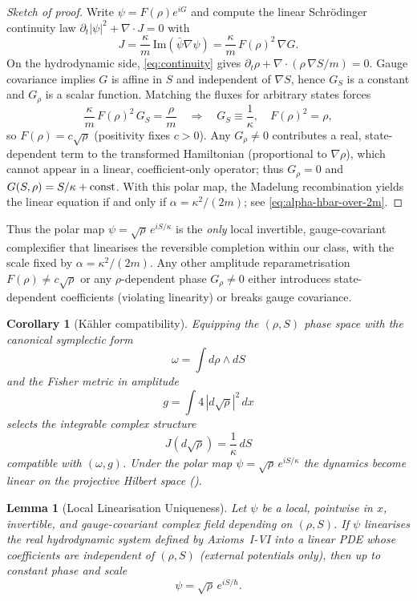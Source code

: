 \documentclass[11pt,a4paper]{article}
\numberwithin{equation}{section}
\theoremstyle{thmcompact}
\newtheorem{lemma}[theorem]{Lemma}
\newtheorem{corollary}[theorem]{Corollary}
\theoremstyle{remark}
\begin{document}
\begin{proof}[Sketch of proof]
	Write $\psi=F(\rho)e^{iG}$ and compute the linear Schrödinger continuity law
	\(
	\partial_t|\psi|^2+\nabla\!\cdot J=0
	\)
	with
	\[
	J=\frac{\kappa}{m}\,\mathrm{Im}(\bar\psi\nabla\psi)
	= \frac{\kappa}{m}\,F(\rho)^2\,\nabla G.
	\]
	On the hydrodynamic side, \eqref{eq:continuity} gives
	\(
	\partial_t\rho+\nabla\!\cdot(\rho\,\nabla S/m)=0.
	\)
	Gauge covariance implies $G$ is affine in $S$ and independent of $\nabla S$,
	hence $G_S$ is a constant and $G_\rho$ is a scalar function. Matching the
	fluxes for arbitrary states forces
	\[
	\frac{\kappa}{m}\,F(\rho)^2\,G_S=\frac{\rho}{m}
	\quad\Rightarrow\quad
	G_S\equiv\frac{1}{\kappa},\quad F(\rho)^2=\rho,
	\]
	so $F(\rho)=c\sqrt\rho$ (positivity fixes $c>0$). Any $G_\rho\neq 0$
	contributes a real, state-dependent term to the transformed Hamiltonian
	(proportional to $\nabla\rho$), which cannot appear in a linear,
	coefficient-only operator; thus $G_\rho=0$ and
	$G(S,\rho)=S/\kappa+{\rm const}$. With this polar map, the Madelung
	recombination yields the linear equation if and only if
	$\alpha=\kappa^{2}/(2m)$; see \eqref{eq:alpha-hbar-over-2m}.
\end{proof}

Thus the polar map $\psi=\sqrt{\rho}\,e^{iS/\kappa}$ is the \emph{only} local
invertible, gauge-covariant complexifier that linearises the reversible
completion within our class, with the scale fixed by $\alpha=\kappa^2/(2m)$.
Any other amplitude reparametrisation $F(\rho)\neq c\sqrt\rho$ or any
$\rho$-dependent phase $G_\rho\neq 0$ either introduces state-dependent
coefficients (violating linearity) or breaks gauge covariance.

\begin{corollary}[Kähler compatibility]
	Equipping the $(\rho,S)$ phase space with the canonical symplectic form
	\[
	\omega=\int d\rho\wedge dS
	\]
	and the Fisher metric in amplitude
	\[
	g=\int 4\,|d\sqrt{\rho}|^{2}\,dx
	\]
	selects the integrable complex structure
	\[
	J(d\sqrt{\rho})=\frac{1}{\kappa}\,dS
	\]
	compatible with $(\omega,g)$. Under the polar map
	$\psi=\sqrt{\rho}\,e^{iS/\kappa}$ the dynamics become linear on the
	projective Hilbert space (\cite{kibble1979,anandan1990}).
\end{corollary}

\begin{lemma}[Local Linearisation Uniqueness]
	Let $\psi$ be a \emph{local}, \emph{pointwise in $x$}, \emph{invertible}, and
	\emph{gauge-covariant} complex field depending on $(\rho,S)$.
	If $\psi$ linearises the real hydrodynamic system defined by Axioms~I-VI
	into a linear PDE whose coefficients are independent of $(\rho,S)$ (external
	potentials only), then up to constant phase and scale
	\[
	\psi=\sqrt\rho\,e^{iS/\hbar}.
	\]
\end{lemma}
\end{document}
